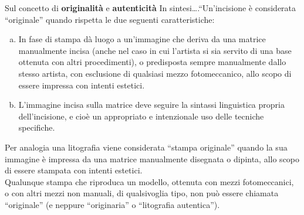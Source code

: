 \documentclass[hidelinks,aspectratio=169]{beamer}
\begin{document}
	\begin{frame}{Sul concetto di \textbf{originalità} e \textbf{autenticità}}
		In sintesi….“Un’incisione è considerata “originale” quando rispetta le due seguenti caratteristiche:
		\begin{enumerate}[a.]
			\item In fase di stampa dà luogo a un’immagine che deriva da una matrice manualmente incisa (anche nel caso in cui l’artista si sia servito di una base ottenuta con altri procedimenti), o predisposta sempre manualmente dallo stesso artista, con esclusione di qualsiasi mezzo fotomeccanico, allo scopo di essere impressa con intenti estetici.
			\item L’immagine incisa sulla matrice deve seguire la sintassi linguistica propria dell'incisione, e cioè un appropriato e intenzionale uso delle tecniche specifiche.
		\end{enumerate}
		Per analogia una litografia viene considerata “stampa originale” quando la sua immagine è impressa da una matrice manualmente disegnata o dipinta, allo scopo di essere stampata con intenti estetici.\\
		Qualunque stampa che riproduca un modello, ottenuta con mezzi fotomeccanici, o con altri mezzi non manuali, di qualsivoglia tipo, non può essere chiamata “originale” (e neppure “originaria” o “litografia autentica”).
	\end{frame}
	
\end{document}
